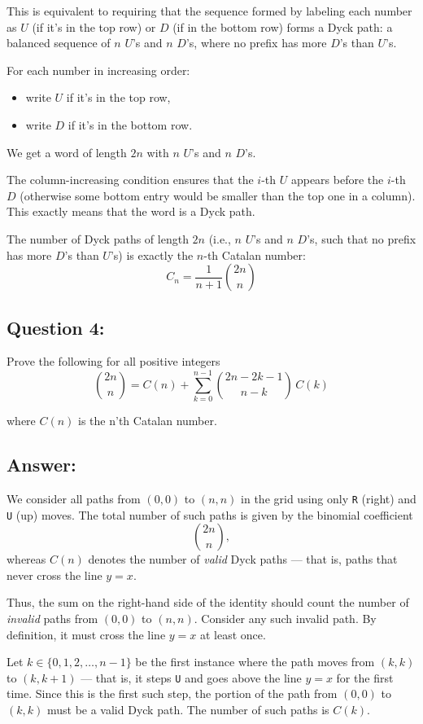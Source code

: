 \documentclass{article}
\begin{document}
This is equivalent to requiring that the sequence formed by labeling each number as $U$ (if it's in the top row) or $D$ (if in the bottom row) forms a Dyck path: a balanced sequence of $n$ $U$'s and $n$ $D$'s, where no prefix has more $D$'s than $U$'s.

For each number in increasing order:
\begin{itemize}
    \item write $U$ if it's in the top row,
    \item write $D$ if it's in the bottom row.
\end{itemize}

We get a word of length $2n$ with $n$ $U$'s and $n$ $D$'s.

The column-increasing condition ensures that the $i$-th $U$ appears before the $i$-th $D$ (otherwise some bottom entry would be smaller than the top one in a column). This exactly means that the word is a Dyck path.


The number of Dyck paths of length $2n$ (i.e., $n$ $U$'s and $n$ $D$'s, such that no prefix has more $D$'s than $U$'s) is exactly the $n$-th Catalan number:
\[
C_n = \frac{1}{n+1} \binom{2n}{n}
\]

\subsection*{Question 4:} Prove the following for all positive integers
\begin{equation*}
    \binom{2n}{n} = C(n) + \sum_{k=0}^{n-1} \binom{2n - 2k - 1}{n - k} \, C(k)
\end{equation*}

where $C(n)$ is the n'th Catalan number.

\subsection*{Answer:}
We consider all paths from $(0,0)$ to $(n,n)$ in the grid using only \texttt{R} (right) and \texttt{U} (up) moves. The total number of such paths is given by the binomial coefficient
\[
\binom{2n}{n},
\]
whereas $C(n)$ denotes the number of \emph{valid} Dyck paths — that is, paths that never cross the line $y = x$.

Thus, the sum on the right-hand side of the identity should count the number of \emph{invalid} paths from $(0,0)$ to $(n,n)$. Consider any such invalid path. By definition, it must cross the line $y = x$ at least once.

Let $k \in \{0, 1, 2, \dots, n - 1\}$ be the first instance where the path moves from $(k, k)$ to $(k, k+1)$ — that is, it steps \texttt{U} and goes above the line $y = x$ for the first time. Since this is the first such step, the portion of the path from $(0,0)$ to $(k,k)$ must be a valid Dyck path. The number of such paths is $C(k)$.
\end{document}
